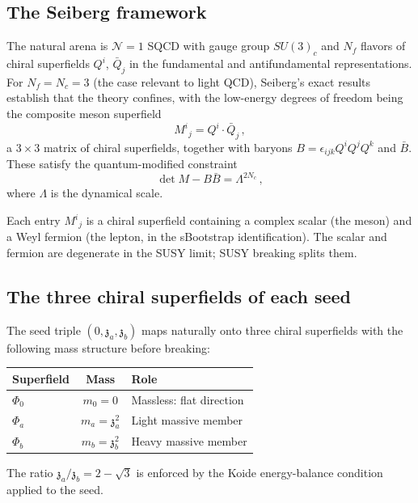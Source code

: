 \documentclass[12pt,a4paper]{article}
\newcommand{\zch}{\mathfrak{z}}
\begin{document}
\subsection{The Seiberg framework}

The natural arena is $\mathcal{N}=1$ SQCD with gauge group $SU(3)_c$ 
and $N_f$ flavors of chiral superfields $Q^i$, $\bar{Q}_j$ in the 
fundamental and antifundamental representations. For $N_f = N_c = 3$ 
(the case relevant to light QCD), Seiberg's exact results 
\cite{Seiberg1995} establish that the theory confines, with the 
low-energy degrees of freedom being the composite meson superfield
\begin{equation}
M^i{}_j = Q^i \cdot \bar{Q}_j\,,
\end{equation}
a $3\times 3$ matrix of chiral superfields, together with baryons 
$B = \epsilon_{ijk}Q^iQ^jQ^k$ and $\bar{B}$. These satisfy the 
quantum-modified constraint
\begin{equation}
\label{eq:seiberg}
\det M - B\bar{B} = \Lambda^{2N_c}\,,
\end{equation}
where $\Lambda$ is the dynamical scale.

Each entry $M^i{}_j$ is a chiral superfield containing a complex 
scalar (the meson) and a Weyl fermion (the lepton, in the sBootstrap 
identification). The scalar and fermion are degenerate in the SUSY 
limit; SUSY breaking splits them.

\subsection{The three chiral superfields of each seed}

The seed triple $(0, \zch_a, \zch_b)$ maps naturally onto three 
chiral superfields with the following mass structure before breaking:

\begin{center}
\begin{tabular}{lcl}
\toprule
Superfield & Mass & Role \\
\midrule
$\Phi_0$ & $m_0 = 0$ & Massless: flat direction \\
$\Phi_a$ & $m_a = \zch_a^2$ & Light massive member \\
$\Phi_b$ & $m_b = \zch_b^2$ & Heavy massive member \\
\bottomrule
\end{tabular}
\end{center}

The ratio $\zch_a/\zch_b = 2 - \sqrt{3}$ is enforced by the 
Koide energy-balance condition applied to the seed.
\end{document}
